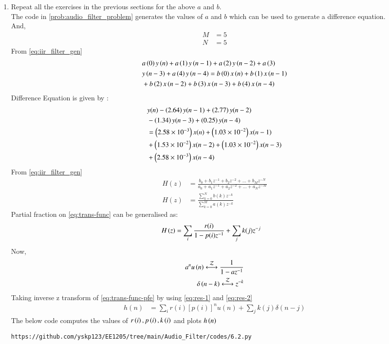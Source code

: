 \documentclass[journal,12pt,twocolumn]{IEEEtran}
\theoremstyle{remark}
\begin{document}
\begin{enumerate}[label=\thesection.\arabic*]
\item Repeat all the exercises in the previous sections for the above $a$ and $b$.\\
\solution The code in \ref{prob:audio_filter_problem} generates the values of $a$ and $b$  which can be used to generate a difference equation.\\
And,
\begin{align}
    M &= 5\\
    N&=5
\end{align}
From \ref{eq:iir_filter_gen} 
\begin{align}
    &a\left(0\right)y\left(n\right) + a\left(1\right)y\left(n-1\right)+a\left(2\right)y\left(n-2\right)+a\left(3\right)\\ \notag &y\left(n-3\right) + a\left(4\right)y\left(n-4\right) =   b\left(0\right)x\left(n\right) + b\left(1\right)x\left(n-1\right)\\ \notag &+b\left(2\right)x\left(n-2\right)+b\left(3\right)x\left(n-3\right) + b\left(4\right)x\left(n-4\right) 
\end{align}
Difference Equation is given by :
\begin{align}
	&y(n) - \left(2.64\right)y(n - 1) + \left(2.77\right)y(n - 2) \nonumber \\
	&- \left(1.34\right)y(n - 3) + \left(0.25\right)y(n - 4) \nonumber \\
	&= \left(2.58\times 10^{-3}\right)x(n) + \left(1.03 \times 10^{-2}\right)x(n - 1) \nonumber \\
	&+ \left(1.53 \times 10^{-2}\right)x(n - 2) + \left(1.03 \times 10^{-2}\right)x(n - 3) \nonumber \\
	&+ \left(2.58 \times 10^{-3}\right)x(n - 4)
\end{align}
From \eqref{eq:iir_filter_gen} 
\begin{align}
    H(z) &= \frac{b_0 + b_1 z^{-1} + b_2 z^{-2} + \ldots + b_M z^{-N}}{a_0 + a_1 z^{-1} + a_2 z^{-2} + \ldots + a_N z^{-M}}\\
    H(z) &= \frac{\sum_{k = 0}^{N}b(k)z^{-k}}{\sum_{k = 0}^{M}a(k)z^{-k}} \label{eq:trans-func}
\end{align}
Partial fraction on \eqref{eq:trans-func} can be generalised as:
\begin{align}
    H\left(z\right)&= \sum_{i}\frac{r(i)}{1 - p(i)z^{-1}} + \sum_{j}k(j)z^{-j}
	\label{eq:trans-func-pfe}
\end{align}
Now,
\begin{align}
    a^{n}u\brak{n} \system{Z} \frac{1}{1-az^{-1}} \label{eq:res-1}\\
    \delta\brak{n-k} \system{Z} z^{-k}\label{eq:res-2}
\end{align}
Taking inverse z transform of \eqref{eq:trans-func-pfe} by using \eqref{eq:res-1} and \eqref{eq:res-2}
\begin{align}
h(n) &= \sum_{i}r(i)[p(i)]^nu(n) + \sum_{j}k(j)\delta(n - j)
	\label{eq:h-n-expr}
\end{align}
The below code computes the values of $r\left(i\right),p\left(i\right) , k\left(i\right)$ and plots $h\left(n\right)$
\begin{lstlisting}
https://github.com/yskp123/EE1205/tree/main/Audio_Filter/codes/6.2.py
\end{lstlisting}



\end{enumerate}
\end{document}
